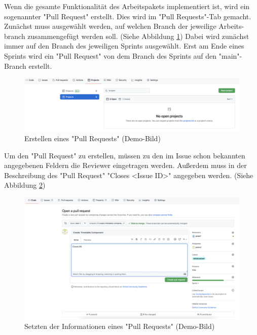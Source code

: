 
Wenn die gesamte Funktionalität des Arbeitspakets implementiert ist, wird ein sogenannter "Pull Request" erstellt. Dies wird im "Pull Requests"-Tab gemacht. Zunächst muss ausgewählt werden, auf welchen Branch der jeweilige Arbeits-branch zusammengefügt werden soll. (Siehe Abbildung \ref{fig:createPullRequest}) Dabei wird zunächst immer auf den Branch des jeweiligen Sprints ausgewählt. Erst am Ende eines Sprints wird ein "Pull Request" von dem Branch des Sprints auf den "main"-Branch erstellt.

\begin{figure}[H]
    \centering
    \includegraphics[width=\textwidth]{media/ProjectManagement/CreateProject.png}
    \caption{Erstellen eines "Pull Requests" (Demo-Bild)}
    \label{fig:createPullRequest}
\end{figure}

Um den "Pull Request" zu erstellen, müssen zu den im Issue schon bekannten angegebenen Feldern die Reviewer eingetragen werden. Außerdem muss in der Beschreibung des "Pull Request" "Closes \textless Issue ID\textgreater" angegeben werden. (Siehe Abbildung \ref{fig:EnterPullRequestInfo})

\begin{figure}[H]
    \centering
    \includegraphics[width=\textwidth]{media/ProjectManagement/EnterPullInfo.png}
    \caption{Setzten der Informationen eines "Pull Requests" (Demo-Bild)}
    \label{fig:EnterPullRequestInfo}
\end{figure}
 
